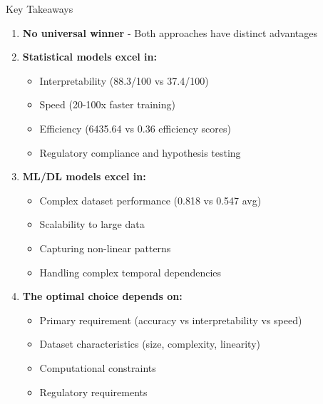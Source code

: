 \documentclass[aspectratio=169,10pt]{beamer}
\begin{document}

\begin{frame}{Key Takeaways}
\begin{enumerate}
    \item \textbf{No universal winner} - Both approaches have distinct advantages
    
    \vspace{0.3cm}
    
    \item \textbf{Statistical models excel in:}
    \begin{itemize}
        \item Interpretability (88.3/100 vs 37.4/100)
        \item Speed (20-100x faster training)
        \item Efficiency (6435.64 vs 0.36 efficiency scores)
        \item Regulatory compliance and hypothesis testing
    \end{itemize}
    
    \vspace{0.3cm}
    
    \item \textbf{ML/DL models excel in:}
    \begin{itemize}
        \item Complex dataset performance (0.818 vs 0.547 avg)
        \item Scalability to large data
        \item Capturing non-linear patterns
        \item Handling complex temporal dependencies
    \end{itemize}
    
    \vspace{0.3cm}
    
    \item \textbf{The optimal choice depends on:}
    \begin{itemize}
        \item Primary requirement (accuracy vs interpretability vs speed)
        \item Dataset characteristics (size, complexity, linearity)
        \item Computational constraints
        \item Regulatory requirements
    \end{itemize}
\end{enumerate}
\end{frame}
\end{document}
